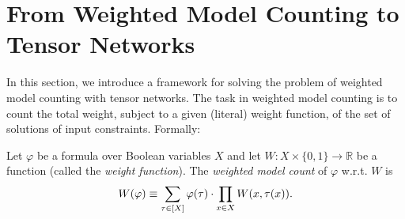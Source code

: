 \section{From Weighted Model Counting to Tensor Networks}
\label{sec:tensors:wmc}
In this section, we introduce a framework for solving the problem of weighted model counting with tensor networks. The task in weighted model counting is to count the total weight, subject to a given (literal) weight function, of the set of solutions of input constraints. Formally:
\begin{definition}
  Let $\varphi$ be a formula over Boolean variables $X$ and let $W: X \times \{0,1\} \rightarrow \mathbb{R}$ be a function (called the \emph{weight function}). The \emph{weighted model count} of $\varphi$ w.r.t. $W$ is
  $$W(\varphi) \equiv \sum_{\tau \in [X]} \varphi(\tau) \cdot \prod_{x \in X} W(x, \tau(x)).$$
\end{definition}






